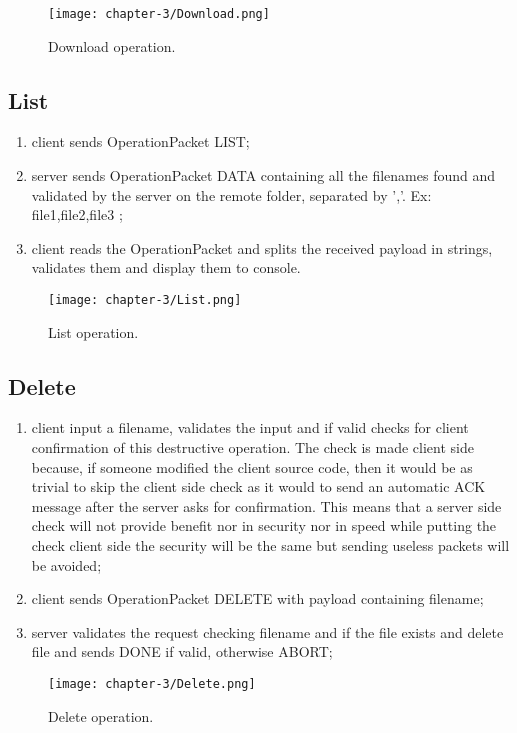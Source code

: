 \begin{figure}[!h] 
    \centering 
    \texttt{[image: chapter-3/Download.png]} 
    \caption{Download operation.}
    \label{fig:download_operation}
\end{figure}
\newpage{}
\subsection{List}
\begin{enumerate}
	\item client sends OperationPacket LIST;
	\item server sends OperationPacket DATA containing all the filenames found and validated by the server on the remote folder, separated by ','. Ex: file1,file2,file3 ;
	\item client reads the OperationPacket and splits the received payload in strings, validates them and display them to console.
	
\end{enumerate}
\begin{figure}[!h] 
    \centering 
    \texttt{[image: chapter-3/List.png]} 
    \caption{List operation.}
    \label{fig:list_operation}
\end{figure}

\subsection{Delete}
\begin{enumerate}
	\item client input a filename, validates the input and if valid checks for client confirmation of this destructive operation. The check is made client side because, if someone modified the client source code, then it would be as trivial to skip the client side check as it would to send an automatic ACK message after the server asks for confirmation. This means that a server side check will not provide benefit nor in security nor in speed while putting the check client side the security will be the same but sending useless packets will be avoided;
	\item client sends OperationPacket DELETE with payload containing filename;
	\item server validates the request checking filename and if the file exists and delete file and sends DONE if valid, otherwise ABORT;
\end{enumerate}

\begin{figure}[!h] 
    \centering 
    \texttt{[image: chapter-3/Delete.png]} 
    \caption{Delete operation.}
    \label{fig:delete_operation}
\end{figure}

